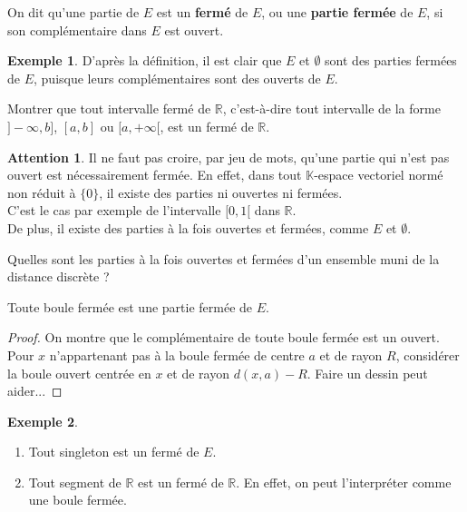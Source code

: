 \documentclass[french]{article}
\newcommand{\R}{\mathbb{R}}
\newcommand{\K}{\mathbb{K}}
\theoremstyle{plain}
\theoremstyle{definition}
\newtheorem*{ex}{Exemple}
\newtheorem*{attention}{Attention}
\theoremstyle{remark}
\begin{document}
\begin{dfn}
	On dit qu'une partie de $E$ est un \textbf{fermé} de $E$, ou une \textbf{partie fermée} de $E$, si son complémentaire dans $E$ est ouvert.
\end{dfn}

\begin{ex}
	D'après la définition, il est clair que $E$ et $\emptyset$ sont des parties fermées de $E$, puisque leurs complémentaires sont des ouverts de $E$.
\end{ex}

\begin{exo}
	Montrer que tout intervalle fermé de $\R$, c'est-à-dire tout intervalle de la forme $]-\infty,b]$, $[a,b]$ ou $[a,+\infty[$, est un fermé de $\R$.
\end{exo}

\begin{attention}
Il ne faut pas croire, par jeu de mots, qu'une partie qui n'est pas ouvert est nécessairement fermée. En effet, dans tout $\K$-espace vectoriel normé non réduit à $\{0\}$, il existe des parties ni ouvertes ni fermées.\\
C'est le cas par exemple de l'intervalle $[0,1[$ dans $\R$.\\
De plus, il existe des parties à la fois ouvertes et fermées, comme $E$ et $\emptyset$.
\end{attention}

\begin{exo}
	Quelles sont les parties à la fois ouvertes et fermées d'un ensemble muni de la distance discrète ?
\end{exo}

\begin{prop}
	Toute boule fermée est une partie fermée de $E$.
\end{prop}
\begin{proof}
	On montre que le complémentaire de toute boule fermée est un ouvert. Pour $x$ n'appartenant pas à la boule fermée de centre $a$ et de rayon $R$, considérer la boule ouvert centrée en $x$ et de rayon $d(x,a)-R$. Faire un dessin peut aider...
\end{proof}

\begin{ex}
	\begin{enumerate}
		\item Tout singleton est un fermé de $E$.
		\item Tout segment  de $\R$ est un fermé de $\R$. En effet, on peut l'interpréter comme une boule fermée.
	\end{enumerate}
\end{ex}
\end{document}
